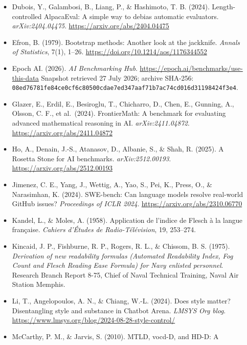 \documentclass[
]{article}
\begin{document}
\begin{itemize}
{  Quantitative Linguistics}, 17(2), 94--100.
  \url{https://doi.org/10.1080/09296171003643098}
\item
  Dubois, Y., Galambosi, B., Liang, P., \& Hashimoto, T. B. (2024).
  Length-controlled AlpacaEval: A simple way to debias automatic
  evaluators. \emph{arXiv:2404.04475}.
  \url{https://arxiv.org/abs/2404.04475}
\item
  Efron, B. (1979). Bootstrap methods: Another look at the jackknife.
  \emph{Annals of Statistics}, 7(1), 1--26.
  \url{https://doi.org/10.1214/aos/1176344552}
\item
  Epoch AI. (2026). \emph{AI Benchmarking Hub}.
  \url{https://epoch.ai/benchmarks/use-this-data} Snapshot retrieved 27 July
  2026; archive SHA-256:\\
  \nolinkurl{08ed76781fe84ce0cf6c80500cdae7ed347aaf71b7ac74cd016d31198424f3e4}.
\item
  Glazer, E., Erdil, E., Besiroglu, T., Chicharro, D., Chen, E.,
  Gunning, A., Olsson, C. F., et al.~(2024). FrontierMath: A benchmark
  for evaluating advanced mathematical reasoning in AI.
  \emph{arXiv:2411.04872}. \url{https://arxiv.org/abs/2411.04872}
\item
  Ho, A., Denain, J.-S., Atanasov, D., Albanie, S., \& Shah, R. (2025).
  A Rosetta Stone for AI benchmarks. \emph{arXiv:2512.00193}.
  \url{https://arxiv.org/abs/2512.00193}
\item
  Jimenez, C. E., Yang, J., Wettig, A., Yao, S., Pei, K., Press, O., \&
  Narasimhan, K. (2024). SWE-bench: Can language models resolve
  real-world GitHub issues? \emph{Proceedings of ICLR 2024}.
  \url{https://arxiv.org/abs/2310.06770}
\item
  Kandel, L., \& Moles, A. (1958). Application de l'indice de Flesch à
  la langue française. \emph{Cahiers d'Études de Radio-Télévision}, 19,
  253--274.
\item
  Kincaid, J. P., Fishburne, R. P., Rogers, R. L., \& Chissom, B. S.
  (1975). \emph{Derivation of new readability formulas (Automated
  Readability Index, Fog Count and Flesch Reading Ease Formula) for Navy
  enlisted personnel}. Research Branch Report 8-75, Chief of Naval
  Technical Training, Naval Air Station Memphis.
\item
  Li, T., Angelopoulos, A. N., \& Chiang, W.-L. (2024). Does style
  matter? Disentangling style and substance in Chatbot Arena.
  \emph{LMSYS Org blog}.
  \url{https://www.lmsys.org/blog/2024-08-28-style-control/}
\item
  McCarthy, P. M., \& Jarvis, S. (2010). MTLD, vocd-D, and HD-D: A

\end{itemize}
\end{document}
